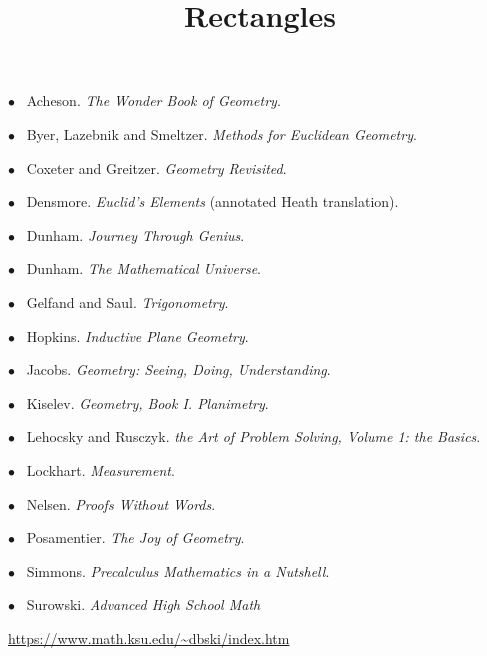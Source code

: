 \documentclass[11pt, oneside]{article}
\title{Rectangles}
\date{}
\begin{document}
\maketitle
\Large

\label{sec:list_of_references}


$\bullet$ \ Acheson.  \emph{The Wonder Book of Geometry}.

$\bullet$ \ Byer, Lazebnik and Smeltzer.  \emph{Methods for Euclidean Geometry}.

$\bullet$ \ Coxeter and Greitzer.  \emph{Geometry Revisited}.

$\bullet$ \ Densmore. \emph{Euclid's Elements} (annotated Heath translation).

$\bullet$ \ Dunham. \emph{Journey Through Genius}.

$\bullet$ \ Dunham. \emph{The Mathematical Universe}.

$\bullet$ \ Gelfand and Saul. \emph{Trigonometry}.

$\bullet$ \ Hopkins. \emph{Inductive Plane Geometry}.

$\bullet$ \ Jacobs. \emph{Geometry:  Seeing, Doing, Understanding}.

$\bullet$ \ Kiselev. \emph{Geometry, Book I. Planimetry}.

$\bullet$ \ Lehocsky and Rusczyk.  \emph{the Art of Problem Solving, Volume 1:  the Basics}.

$\bullet$ \ Lockhart. \emph{Measurement}.

$\bullet$ \ Nelsen. \emph{Proofs Without Words}.

$\bullet$ \ Posamentier.  \emph{The Joy of Geometry}.

$\bullet$ \ Simmons.  \emph{Precalculus Mathematics in a Nutshell}.

$\bullet$ \ Surowski.  \emph{Advanced High School Math}

\url{https://www.math.ksu.edu/~dbski/index.htm}
\end{document}

